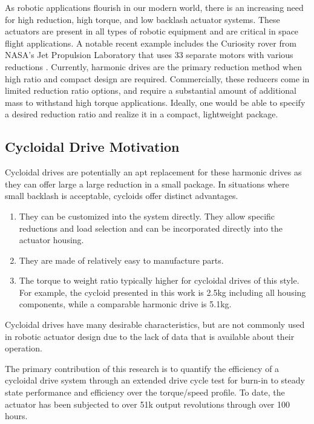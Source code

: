 As robotic applications flourish in our modern world, there is an increasing need for high reduction, high torque, and low backlash actuator systems.
These actuators are present in all types of robotic equipment and are critical in space flight applications.
A notable recent example includes the Curiosity rover from NASA's Jet Propulsion Laboratory that uses 33 separate motors with various reductions \cite{ref:curiosity}.
Currently, harmonic drives are the primary reduction method when high ratio and compact design are required.
Commercially, these reducers come in limited reduction ratio options, and require a substantial amount of additional mass to withstand high torque applications.
Ideally, one would be able to specify a desired reduction ratio and realize it in a compact, lightweight package.

\subsection{Cycloidal Drive Motivation}

Cycloidal drives are potentially an apt replacement for these harmonic drives as they can offer large a large reduction in a small package.
In situations where small backlash is acceptable, cycloids offer distinct advantages.

\begin{enumerate}
\item
They can be customized into the system directly. They allow specific reductions and load selection and can be incorporated directly into the actuator housing.
\item
They are made of relatively easy to manufacture parts.
\item
The torque to weight ratio typically higher for cycloidal drives of this style.
For example, the cycloid presented in this work is 2.5kg including all housing components, while a comparable harmonic drive is 5.1kg.
\end{enumerate}

Cycloidal drives have many desirable characteristics, but are not commonly used in robotic actuator design due to the lack of data that is available about their operation.

The primary contribution of this research is to quantify the efficiency of a cycloidal drive system through an extended drive cycle test for burn-in to steady state performance and efficiency over the torque/speed profile.
To date, the actuator has been subjected to over 51k output revolutions through over 100 hours.

